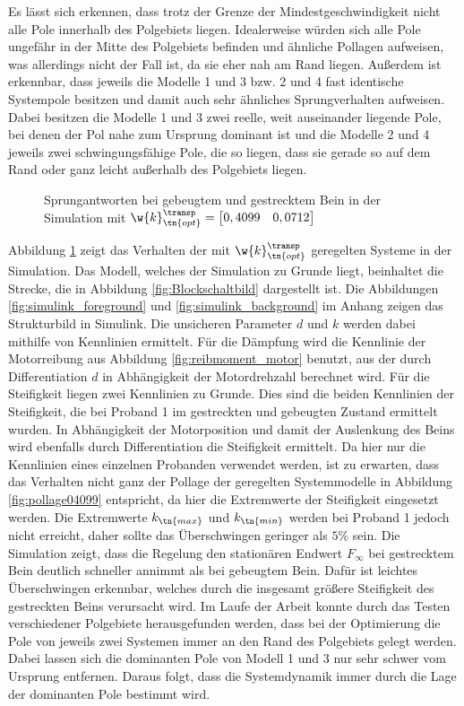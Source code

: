 Es lässt sich erkennen, dass trotz der Grenze der Mindestgeschwindigkeit nicht alle Pole innerhalb des Polgebiets liegen. Idealerweise würden sich alle Pole ungefähr in der Mitte des Polgebiets befinden und ähnliche Pollagen aufweisen, was allerdings nicht der Fall ist, da sie eher nah am Rand liegen. Außerdem ist erkennbar, dass jeweils die Modelle 1 und 3 bzw. 2 und 4 fast identische Systempole besitzen und damit auch sehr ähnliches Sprungverhalten aufweisen. Dabei besitzen die Modelle 1 und 3 zwei reelle, weit auseinander liegende Pole, bei denen der Pol nahe zum Ursprung dominant ist und die Modelle 2 und 4 jeweils zwei schwingungsfähige Pole, die so liegen, dass sie gerade so auf dem Rand oder ganz leicht außerhalb des Polgebiets liegen. 
\begin{figure}[H]
	\centering
	\caption[sprungantwort_simulink]{Sprungantworten bei gebeugtem und gestrecktem Bein in der Simulation mit $\w{k}_\tn{opt}^\transp = \begin{bmatrix} 0,4099 & 0,0712\end{bmatrix}$}
	\label{fig:sprungantwort_simulink}
\end{figure}
Abbildung \ref{fig:sprungantwort_simulink} zeigt das Verhalten der mit $\w{k}_\tn{opt}^\transp$ geregelten Systeme in der Simulation. Das Modell, welches der Simulation zu Grunde liegt, beinhaltet die Strecke, die in Abbildung \ref{fig:Blockschaltbild} dargestellt ist. Die Abbildungen \ref{fig:simulink_foreground} und \ref{fig:simulink_background} im Anhang zeigen das Strukturbild in Simulink. Die unsicheren Parameter $d$ und $k$ werden dabei mithilfe von Kennlinien ermittelt. Für die Dämpfung wird die Kennlinie der Motorreibung aus Abbildung \ref{fig:reibmoment_motor} benutzt, aus der durch Differentiation $d$ in Abhängigkeit der Motordrehzahl berechnet wird. Für die Steifigkeit liegen zwei Kennlinien zu Grunde. Dies sind die beiden Kennlinien der Steifigkeit, die bei Proband 1 im gestreckten und gebeugten Zustand ermittelt wurden. In Abhängigkeit der Motorposition und damit der Auslenkung des Beins wird ebenfalls durch Differentiation die Steifigkeit ermittelt. Da hier nur die Kennlinien eines einzelnen Probanden verwendet werden, ist zu erwarten, dass das Verhalten nicht ganz der Pollage der geregelten Systemmodelle in Abbildung \ref{fig:pollage04099} entspricht, da hier die Extremwerte der Steifigkeit eingesetzt werden. Die Extremwerte $k_\tn{max}$ und $k_\tn{min}$ werden bei Proband 1 jedoch nicht erreicht, daher sollte das Überschwingen geringer als $5\%$ sein. Die Simulation zeigt, dass die Regelung den stationären Endwert $F_\infty$ bei gestrecktem Bein deutlich schneller annimmt als bei gebeugtem Bein. Dafür ist leichtes Überschwingen erkennbar, welches durch die insgesamt größere Steifigkeit des gestreckten Beins verursacht wird. Im Laufe der Arbeit konnte durch das Testen verschiedener Polgebiete herausgefunden werden, dass bei der Optimierung die Pole von jeweils zwei Systemen immer an den Rand des Polgebiets gelegt werden. Dabei lassen sich die dominanten Pole von Modell 1 und 3 nur sehr schwer vom Ursprung entfernen. Daraus folgt, dass die Systemdynamik immer durch die Lage der dominanten Pole bestimmt wird.
